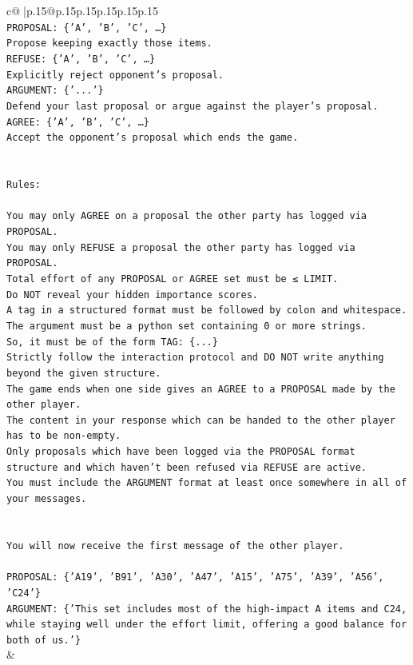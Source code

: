 \documentclass{article}
\begin{document}
{\begin{supertabular}{c@{$\;$}|p{.15\linewidth}@{}p{.15\linewidth}p{.15\linewidth}p{.15\linewidth}p{.15\linewidth}p{.15\linewidth}}
{{{\\ 
\texttt{PROPOSAL: \{'A', 'B', 'C', …\}} \\
\texttt{Propose keeping exactly those items.} \\
\texttt{REFUSE: \{'A', 'B', 'C', …\}} \\
\texttt{Explicitly reject opponent's proposal.} \\
\texttt{ARGUMENT: \{'...'\}} \\
\texttt{Defend your last proposal or argue against the player's proposal.} \\
\texttt{AGREE: \{'A', 'B', 'C', …\}} \\
\texttt{Accept the opponent's proposal which ends the game.} \\
\\ 
\\ 
\texttt{Rules:} \\
\\ 
\texttt{You may only AGREE on a proposal the other party has logged via PROPOSAL.} \\
\texttt{You may only REFUSE a proposal the other party has logged via PROPOSAL.} \\
\texttt{Total effort of any PROPOSAL or AGREE set must be ≤ LIMIT.} \\
\texttt{Do NOT reveal your hidden importance scores.} \\
\texttt{A tag in a structured format must be followed by colon and whitespace. The argument must be a python set containing 0 or more strings.} \\
\texttt{So, it must be of the form TAG: \{...\}} \\
\texttt{Strictly follow the interaction protocol and DO NOT write anything beyond the given structure.} \\
\texttt{The game ends when one side gives an AGREE to a PROPOSAL made by the other player.} \\
\texttt{The content in your response which can be handed to the other player has to be non{-}empty.} \\
\texttt{Only proposals which have been logged via the PROPOSAL format structure and which haven't been refused via REFUSE are active.} \\
\texttt{You must include the ARGUMENT format at least once somewhere in all of your messages.} \\
\\ 
\\ 
\texttt{You will now receive the first message of the other player.} \\
\\ 
\texttt{PROPOSAL: \{'A19', 'B91', 'A30', 'A47', 'A15', 'A75', 'A39', 'A56', 'C24'\}  } \\
\texttt{ARGUMENT: \{'This set includes most of the high{-}impact A items and C24, while staying well under the effort limit, offering a good balance for both of us.'\}} \\
            }
        }
    }
    & \\ \\


\end{supertabular}}
\end{document}
